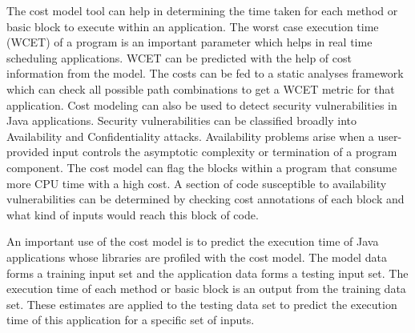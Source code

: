 The cost model tool can help in determining the time taken for each method or basic block to execute within an application. The worst case execution time (WCET) of a program is an important parameter which helps in real time scheduling applications. WCET can be predicted with the help of cost information from the model. The costs can be fed to a static analyses framework which can check all possible path combinations to get a WCET metric for that application. Cost modeling can also be used to detect security vulnerabilities in Java applications. Security vulnerabilities can be classified broadly into Availability and Confidentiality attacks. Availability problems arise when a user-provided input controls the asymptotic complexity or termination of a program component. The cost model can flag the blocks within a program that consume more CPU time with a high cost. A section of code susceptible to availability vulnerabilities can be determined by checking cost annotations of each block and what kind of inputs would reach this block of code.\newline


An important use of the cost model is to predict the execution time of Java applications whose libraries are profiled with the cost model. The model data forms a training input set and the application data forms a testing input set. The execution time of each method or basic block is an output from the training data set. These estimates are applied to the testing data set to predict the execution time of this application for a specific set of inputs.
